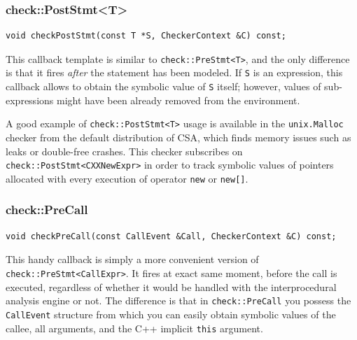 \documentclass[a4paper,12pt]{article}
\newenvironment{nobr}{\begin{minipage}{\textwidth}\setlength\parskip{1em}
}{\end{minipage}\ignorespacesafterend}
\begin{document}
\begin{nobr}
\subsubsection{check::PostStmt<T>}

\begin{lstlisting}[style=cplusplus,numbers=none]
void checkPostStmt(const T *S, CheckerContext &C) const;
\end{lstlisting}

This callback template is similar to \lstinline|check::PreStmt<T>|, and the only difference is that it fires \emph{after} the statement has been modeled. If \lstinline|S| is an expression, this callback allows to obtain the symbolic value of \lstinline|S| itself; however, values of sub-expressions might have been already removed from the environment.
\end{nobr}

A good example of \lstinline|check::PostStmt<T>| usage is available in the \lstinline|unix.Malloc| checker from the default distribution of CSA, which finds memory issues such as leaks or double-free crashes. This checker subscribes on \lstinline|check::PostStmt<CXXNewExpr>| in order to track symbolic values of pointers allocated with every execution of operator \lstinline|new| or \lstinline|new[]|.

\begin{nobr}
\subsubsection{check::PreCall}

\begin{lstlisting}[style=cplusplus,numbers=none]
void checkPreCall(const CallEvent &Call, CheckerContext &C) const;
\end{lstlisting}

This handy callback is simply a more convenient version of \lstinline|check::PreStmt<CallExpr>|. It fires at exact same moment, before the call is executed, regardless of whether it would be handled with the interprocedural analysis engine or not. The difference is that in \lstinline|check::PreCall| you possess the \lstinline|CallEvent| structure from which you can easily obtain symbolic values of the callee, all arguments, and the C++ implicit \lstinline|this| argument.
\end{nobr}
\end{document}
